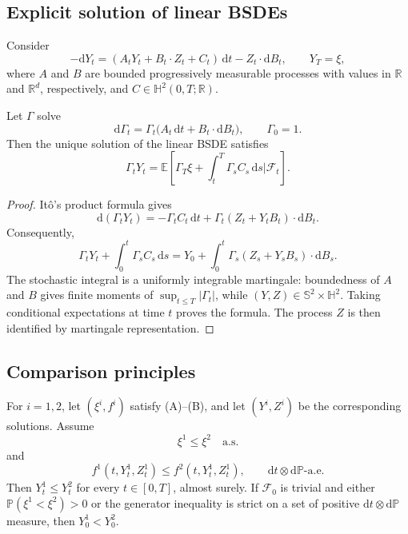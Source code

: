 \subsection{Explicit solution of linear BSDEs}

Consider
\[
  -\mathrm dY_t=(A_tY_t+B_t\cdot Z_t+C_t)\,\mathrm dt
                -Z_t\cdot\mathrm dB_t,
  \qquad Y_T=\xi,
\]
where $A$ and $B$ are bounded progressively measurable processes with
values in $\mathbb R$ and $\mathbb R^d$, respectively, and
$C\in\mathbb H^2(0,T;\mathbb R)$.

\begin{prop}
Let $\Gamma$ solve
\[
  \mathrm d\Gamma_t
  =\Gamma_t\bigl(A_t\,\mathrm dt+B_t\cdot\mathrm dB_t\bigr),
  \qquad \Gamma_0=1.
\]
Then the unique solution of the linear BSDE satisfies
\[
  \Gamma_tY_t
  =\mathbb E\!\left[
      \Gamma_T\xi+\int_t^T\Gamma_sC_s\,\mathrm ds
      \mathrel{\big|}\mathcal F_t
    \right].
\]
\end{prop}

\begin{proof}
It\^o's product formula gives
\[
  \mathrm d(\Gamma_tY_t)
  =-\Gamma_tC_t\,\mathrm dt
   +\Gamma_t(Z_t+Y_tB_t)\cdot\mathrm dB_t.
\]
Consequently,
\[
  \Gamma_tY_t+\int_0^t\Gamma_sC_s\,\mathrm ds
  =Y_0+\int_0^t\Gamma_s(Z_s+Y_sB_s)\cdot\mathrm dB_s.
\]
The stochastic integral is a uniformly integrable martingale: boundedness
of $A$ and $B$ gives finite moments of $\sup_{t\le T}|\Gamma_t|$, while
$(Y,Z)\in\mathbb S^2\times\mathbb H^2$.  Taking conditional expectations
at time $t$ proves the formula.  The process $Z$ is then identified by
martingale representation.
\end{proof}

\subsection{Comparison principles}

\begin{thm}[Comparison]
For $i=1,2$, let $(\xi^i,f^i)$ satisfy \textup{(A)}--\textup{(B)}, and let
$(Y^i,Z^i)$ be the corresponding solutions.  Assume
\[
  \xi^1\le\xi^2\quad\text{a.s.}
\]
and
\[
  f^1(t,Y_t^1,Z_t^1)
  \le f^2(t,Y_t^1,Z_t^1),
  \qquad \mathrm dt\otimes\mathrm d\mathbb P\text{-a.e.}
\]
Then $Y_t^1\le Y_t^2$ for every $t\in[0,T]$, almost surely.
If $\mathcal F_0$ is trivial and either
$\mathbb P(\xi^1<\xi^2)>0$ or the generator inequality is strict on a set
of positive $\mathrm dt\otimes\mathrm d\mathbb P$ measure, then
$Y_0^1<Y_0^2$.
\end{thm}

